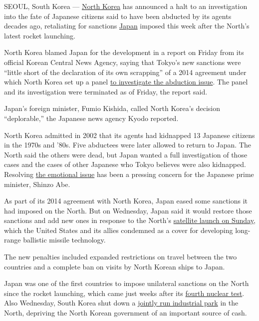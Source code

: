 SEOUL, South Korea ---
\href{http://topics.nytimes3xbfgragh.onion/top/news/international/countriesandterritories/northkorea/index.html?inline=nyt-geo}{North
Korea} has announced a halt to an investigation into the fate of
Japanese citizens said to have been abducted by its agents decades ago,
retaliating for sanctions
\href{http://topics.nytimes3xbfgragh.onion/top/news/international/countriesandterritories/japan/index.html?inline=nyt-geo}{Japan}
imposed this week after the North's latest rocket launching.

North Korea blamed Japan for the development in a report on Friday from
its official Korean Central News Agency, saying that Tokyo's new
sanctions were ``little short of the declaration of its own scrapping''
of a 2014 agreement under which North Korea set up a panel
\href{http://www.nytimes3xbfgragh.onion/2014/05/30/world/asia/north-korea-agrees-to-investigate-fate-of-japanese-abducted-decades-ago.html}{to
investigate the abduction issue}. The panel and its investigation were
terminated as of Friday, the report said.

Japan's foreign minister, Fumio Kishida, called North Korea's decision
``deplorable,'' the Japanese news agency Kyodo reported.

North Korea admitted in 2002 that its agents had kidnapped 13 Japanese
citizens in the 1970s and '80s. Five abductees were later allowed to
return to Japan. The North said the others were dead, but Japan wanted a
full investigation of those cases and the cases of other Japanese who
Tokyo believes were also kidnapped. Resolving
\href{http://www.nytimes3xbfgragh.onion/2014/03/17/world/asia/parents-of-japanese-woman-kidnapped-by-north-korea-meet-their-granddaughter.html}{the
emotional issue} has been a pressing concern for the Japanese prime
minister, Shinzo Abe.

As part of its 2014 agreement with North Korea, Japan eased some
sanctions it had imposed on the North. But on Wednesday, Japan said it
would restore those sanctions and add new ones in response to the
North's
\href{http://www.nytimes3xbfgragh.onion/2016/02/07/world/asia/north-korea-moves-up-rocket-launching-plan.html}{satellite
launch on Sunday}, which the United States and its allies condemned as a
cover for developing long-range ballistic missile technology.

The new penalties included expanded restrictions on travel between the
two countries and a complete ban on visits by North Korean ships to
Japan.

Japan was one of the first countries to impose unilateral sanctions on
the North since the rocket launching, which came just weeks after its
\href{http://www.nytimes3xbfgragh.onion/2016/01/07/world/asia/north-korea-hydrogen-bomb-q-a.html}{fourth
nuclear test}. Also Wednesday, South Korea shut down a
\href{http://www.nytimes3xbfgragh.onion/2016/02/12/world/asia/north-south-korea-kaesong.html}{jointly
run industrial park} in the North, depriving the North Korean government
of an important source of cash.

